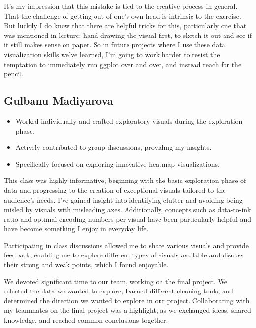 \documentclass[12pt]{article}
\begin{document}
It's my impression that this mistake is tied to the creative process in general. That the challenge of getting out of one's own head is intrinsic to the exercise. But luckily I do know that there are helpful tricks for this, particularly one that was mentioned in lecture: hand drawing the visual first, to sketch it out and see if it still makes sense on paper. So in future projects where I use these data visualization skills we've learned, I'm going to work harder to resist the temptation to immediately run ggplot over and over, and instead reach for the pencil.

\newpage
\subsection{Gulbanu Madiyarova}
\begin{itemize}
  \item Worked individually and crafted exploratory visuals during the exploration phase.
  \item Actively contributed to group discussions, providing my insights.
  \item Specifically focused on exploring innovative heatmap visualizations.
\end{itemize}

This class was highly informative, beginning with the basic exploration phase of data and progressing to the creation of exceptional visuals tailored to the audience's needs. I've gained insight into identifying clutter and avoiding being misled by visuals with misleading axes. Additionally, concepts such as data-to-ink ratio and optimal encoding numbers per visual have been particularly helpful and have become something I enjoy in everyday life.

Participating in class discussions allowed me to share various visuals and provide feedback, enabling me to explore different types of visuals available and discuss their strong and weak points, which I found enjoyable.

We devoted significant time to our team, working on the final project. We selected the data we wanted to explore, learned different cleaning tools, and determined the direction we wanted to explore in our project. Collaborating with my teammates on the final project was a highlight, as we exchanged ideas, shared knowledge, and reached common conclusions together.
\end{document}
